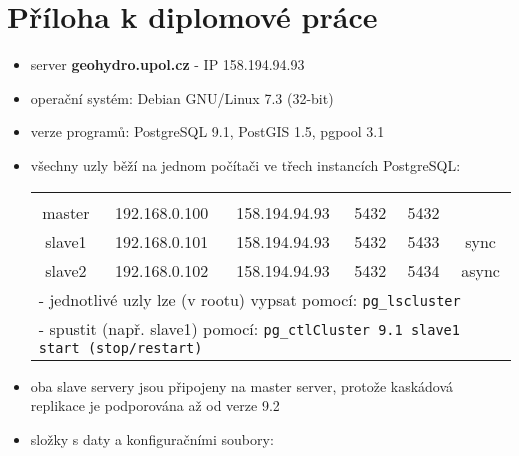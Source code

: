 \documentclass{thesisKGI}
\begin{document}
  \sloppy       %
  \section*{Příloha k diplomové práce}

  \pagestyle{empty}
  \begin{itemize}
    \item server {\bf geohydro.upol.cz} - IP 158.194.94.93
\item operační systém: Debian GNU/Linux 7.3 (32-bit)
\item verze programů: PostgreSQL 9.1, PostGIS 1.5, pgpool 3.1
\item všechny uzly běží na jednom počítači ve třech instancích PostgreSQL:
        \begin{table}[H]
            \label{tServery}
            \begin{center}
            \begin{tabular}{|c|ccccc|}
              \hline
              \color{purpurova7}{název} & \color{purpurova7}{IP adresa v textu} & \color{purpurova7}{skutečná IP adresa} & \color{purpurova7}{port v textu}& \color{purpurova7}{skutečný port} & \color{purpurova7}{replikace}\\
                                   master& 192.168.0.100& 158.194.94.93 & 5432& 5432 & \\
                                   slave1& 192.168.0.101& 158.194.94.93 & 5432& 5433 & sync \\
                                   slave2& 192.168.0.102& 158.194.94.93 & 5432& 5434 & async\\
              \hline
              \multicolumn{6}{l}{- jednotlivé uzly lze (v rootu) vypsat pomocí: \texttt{pg\_lscluster}}\\
              \multicolumn{6}{l}{- spustit (např. slave1) pomocí: \texttt{pg\_ctlCluster 9.1 slave1 start (stop/restart)}}\\
              \end{tabular}
            \end{center}
        \end{table}
\item oba slave servery jsou připojeny na master server, protože kaskádová replikace je podporována až od verze 9.2
\item složky s daty a konfiguračními soubory:
        \begin{table}[H]
            \label{tServery}

\end{table}
\end{itemize}
\end{document}
